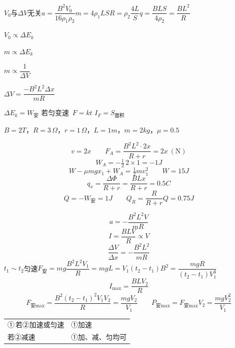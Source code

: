 $V_0$与$\Delta V$无关\qquad $a=\dfrac{B^2V_0}{16\rho_1\rho_2}$\quad $m=4\rho_1LS$\quad $R=\rho_2\dfrac{4L}{S}$\quad $q=\dfrac{BLS}{4\rho_2}=\dfrac{BL^2}{R}$

$V_0\propto\Delta E_k$\qquad {} %

$m\propto\Delta E_k$

$m\propto\dfrac{1}{\Delta V}$

$\Delta V=\dfrac{-B^2L^2\Delta x}{mR}$

$\Delta E_k=W_{\text{安}}$
若匀变速\ $F=kt$
$I_F=S_{\text{面积}}$
\begin{problem}
$B=2\unit{T}$，$R=3\,\Omega$，$r=1\,\Omega$，$L=1\unit{m}$，$m=2\unit{kg}$，$\mu=0.5$
\begin{solution}
\[ v=2x\qquad F_A=\frac{B^2L^2\cdot2x}{R+r}=2x\ (\mathrm{N}) \]
\[ W_A=-\tfrac12\,2\times1=-1\unit{J} \]
\[ W-\mu mgx_1+W_A=\tfrac12mv_1^2\qquad W=15\unit{J} \]
\[ q_x=\frac{\Delta\Phi}{R+r}=\frac{BLx}{R+r}=0.5\unit{C} \]
\[ Q=-W_{\text{安}}=1\unit{J}\qquad Q_R=\frac{R}{R+r}Q=0.75\unit{J} \]
\end{solution}
\end{problem}
\[ a=-\frac{B^2L^2V}{mR} \]
\[ I=\frac{BLV}{R}\propto V \]
\[ \frac{\Delta V}{\Delta x}=-\frac{B^2L^2}{mR} \]
$t_1\sim t_2$匀速\quad$F_{\text{安}}=mg$\quad$\dfrac{B^2L^2V_1}{R}=mg$\quad$L=V_1(t_2-t_1)$\quad$B^2=\dfrac{mgR}{(t_2-t_1)V_1^3}$ %
\[ I_{\max}=\frac{BLV_2}{R} \]
\[ F_{\text{安}\max}=\frac{B^2(t_2-t_1)^2V_1V_2}{R}=\frac{mgV_2}{V_1}\qquad P_{\text{安}\max}=F_{\text{安}\max}V_2=\frac{mgV_2^2}{V_1} \] %
\begin{tabular}{@{}l@{\qquad}l@{}}
①\,若②加速或匀速 & ①加速\\
\hphantom{①\,}若②减速 & ①加、减、匀均可
\end{tabular}

